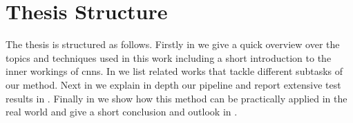 \section{Thesis Structure}
\label{sec:intro:structure}
The thesis is structured as follows. Firstly in \textbf{} we give a quick overview over the topics and techniques used in this work including a short introduction to the inner workings of \glspl{cnn}. In \textbf{} we list related works that tackle different subtasks of our method. Next in \textbf{} we explain in depth our pipeline and report extensive test results in \textbf{}. Finally in \textbf{} we show how this method can be practically applied in the real world and give a short conclusion and outlook in \textbf{}.
